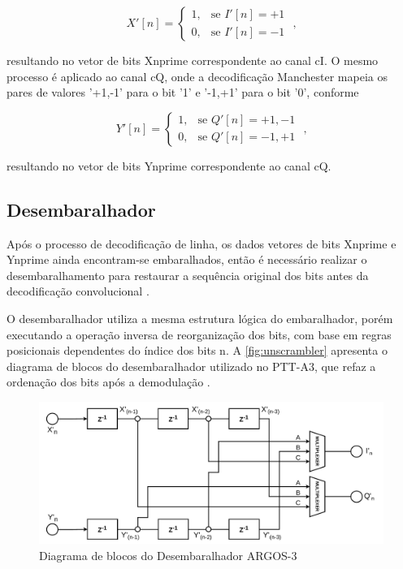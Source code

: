 \begin{equation}
    X'[n] = 
    \begin{cases}
    1, & \text{se } I'[n] = +1 \\
    0, & \text{se } I'[n] = -1
    \end{cases} \text{ ,}
\end{equation}


\noindent resultando no vetor de bits \gls{Xnprime} correspondente ao canal \gls{cI}. O mesmo processo é aplicado ao canal \gls{cQ}, onde a decodificação \gls{Manchester} mapeia os pares de valores '+1,-1' para o bit '1' e '-1,+1' para o bit '0', conforme

\begin{equation}
    Y'[n] = 
    \begin{cases}
    1, & \text{se } Q'[n] = +1,-1 \\
    0, & \text{se } Q'[n] = -1,+1
    \end{cases} \text{ ,}
\end{equation}

\noindent resultando no vetor de bits \gls{Ynprime} correspondente ao canal \gls{cQ}. 

\subsection{Desembaralhador}

Após o processo de decodificação de linha, os dados vetores de bits \gls{Xnprime} e \gls{Ynprime} ainda encontram-se embaralhados, então é necessário realizar o desembaralhamento para restaurar a sequência original dos bits antes da decodificação convolucional \cite{cnes_services_and_message_formats_ed2_rev2_2006}.

O desembaralhador utiliza a mesma estrutura lógica do embaralhador, porém executando a operação inversa de reorganização dos bits, com base em regras posicionais dependentes do índice dos bits \gls{n}. A \autoref{fig:unscrambler} apresenta o diagrama de blocos do desembaralhador utilizado no \gls{PTT-A3}, que refaz a ordenação dos bits após a demodulação \cite{rodrigues_demodulador_2018}.

\begin{figure}[H]
\centering
\caption{Diagrama de blocos do Desembaralhador ARGOS-3}\label{fig:unscrambler}
\includegraphics[width=\linewidth]{assets/cap2/unscrambler.pdf}
\end{figure}

